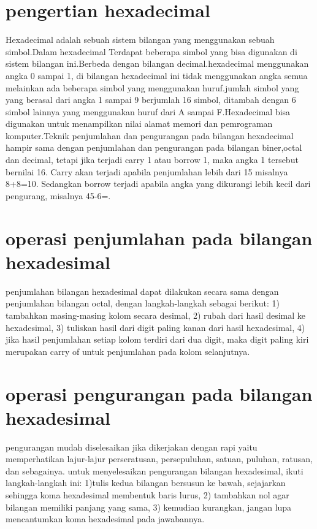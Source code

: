 \section{pengertian hexadecimal}
	Hexadecimal adalah sebuah sistem bilangan yang menggunakan sebuah simbol.Dalam hexadecimal Terdapat beberapa simbol yang bisa digunakan di sistem bilangan ini.Berbeda dengan bilangan decimal.hexadecimal menggunakan angka 0 sampai 1, di bilangan hexadecimal ini tidak menggunakan angka semua melainkan ada beberapa simbol yang menggunakan huruf.jumlah simbol yang yang berasal dari angka 1 sampai 9 berjumlah 16 simbol, ditambah dengan 6 simbol lainnya yang menggunakan huruf dari A sampai F.Hexadecimal bisa digunakan untuk menampilkan nilai alamat memori dan pemrograman komputer.Teknik penjumlahan dan pengurangan pada bilangan hexadecimal hampir sama dengan penjumlahan dan pengurangan pada bilangan biner,octal dan decimal, tetapi jika terjadi carry 1 atau borrow 1, maka angka 1 tersebut bernilai 16. Carry akan terjadi apabila penjumlahan lebih dari 15 misalnya 8+8=10. Sedangkan borrow terjadi apabila angka yang dikurangi lebih kecil dari pengurang, misalnya 45-6=.
\section{operasi penjumlahan pada bilangan hexadesimal}
penjumlahan bilangan hexadesimal dapat dilakukan secara sama dengan penjumlahan bilangan octal, dengan langkah-langkah sebagai berikut: 1) tambahkan masing-masing kolom secara desimal, 2) rubah dari hasil desimal ke hexadesimal, 3) tuliskan hasil dari digit paling kanan dari hasil hexadesimal, 4) jika hasil penjumlahan setiap kolom terdiri dari dua digit, maka digit paling kiri merupakan carry of untuk penjumlahan pada kolom selanjutnya.
\section{operasi pengurangan pada bilangan hexadesimal}
pengurangan mudah diselesaikan jika dikerjakan dengan rapi yaitu memperhatikan lajur-lajur perseratusan, persepuluhan, satuan, puluhan, ratusan, dan sebagainya. untuk menyelesaikan pengurangan bilangan hexadesimal, ikuti langkah-langkah ini: 1)tulis kedua bilangan bersusun ke bawah, sejajarkan sehingga koma hexadesimal membentuk baris lurus, 2) tambahkan nol agar bilangan memiliki panjang yang sama, 3) kemudian kurangkan, jangan lupa mencantumkan koma hexadesimal pada jawabannya.
